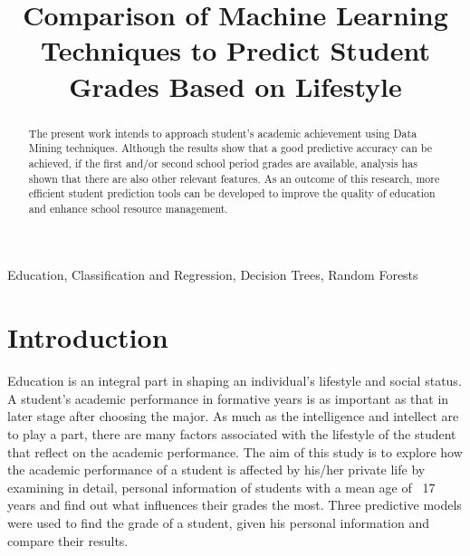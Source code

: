 \documentclass[conference]{IEEEtran}
\begin{document}
\title{Comparison of Machine Learning Techniques to Predict Student Grades Based on Lifestyle\\
}

\author{
\and
{}
}

\maketitle

\begin{abstract}
The present work intends to approach student's academic achievement using Data Mining techniques. Although the results show that a good predictive accuracy can be achieved, if the first and/or second school period grades are available, analysis has shown that there are also other relevant features. As an outcome of this research, more efficient student prediction tools can be developed to improve the quality of education and enhance school resource management.
\end{abstract}

\begin{IEEEkeywords}
Education, Classification and Regression, Decision Trees, Random Forests
\end{IEEEkeywords}

\section{Introduction}
Education is an integral part in shaping an individual's lifestyle and social status. A student's academic performance in formative years is as important as that in later stage after choosing the major. As much as the intelligence and intellect are to play a part, there are many factors associated with the lifestyle of the student that reflect on the academic performance. The aim of this study is to explore how the academic performance of a student is affected by his/her private life by examining in detail, personal information of students with a mean age of ~17 years and find out what influences their grades the most. Three predictive models were used to find the grade of a student, given his personal information and compare their results.
\end{document}
